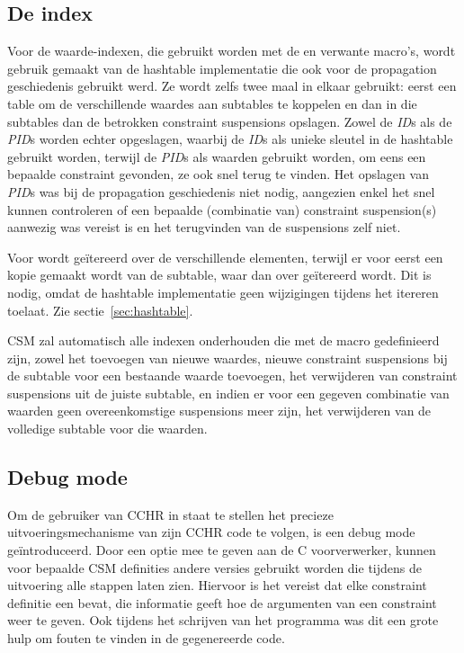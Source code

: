 {\subsection{De index} \label{sec:index}

Voor de waarde-indexen, die gebruikt worden met de  en verwante macro's, wordt gebruik gemaakt van de hashtable implementatie die ook voor de propagation geschiedenis gebruikt werd. Ze wordt zelfs twee maal in elkaar gebruikt: eerst een table om de verschillende waardes aan subtables te koppelen en dan in die subtables dan de betrokken constraint suspensions opslagen. Zowel de {\em ID}s als de {\em PID}s worden echter opgeslagen, waarbij de {\em ID}s als unieke sleutel in de hashtable gebruikt worden, terwijl de {\em PID}s als waarden gebruikt worden, om eens een bepaalde constraint gevonden, ze ook snel terug te vinden. Het opslagen van {\em PID}s was bij de propagation geschiedenis niet nodig, aangezien enkel het snel kunnen controleren of een bepaalde (combinatie van) constraint suspension(s) aanwezig was vereist is en het terugvinden van de suspensions zelf niet.

Voor  wordt ge\"itereerd over de verschillende elementen, terwijl er voor  eerst een kopie gemaakt wordt van de subtable, waar dan over ge\"itereerd wordt. Dit is nodig, omdat de hashtable implementatie geen wijzigingen tijdens het itereren toelaat. Zie sectie~\ref{sec:hashtable}.

CSM zal automatisch alle indexen onderhouden die met de macro  gedefinieerd zijn, zowel het toevoegen van nieuwe waardes, nieuwe constraint suspensions bij de subtable voor een bestaande waarde toevoegen, het verwijderen van constraint suspensions uit de juiste subtable, en indien er voor een gegeven combinatie van waarden geen overeenkomstige suspensions meer zijn, het verwijderen van de volledige subtable voor die waarden.

\subsection{Debug mode} \label{sec:debug}

Om de gebruiker van CCHR in staat te stellen het precieze uitvoeringsmechanisme van zijn CCHR code te volgen, is een debug mode ge\"introduceerd. Door een optie mee te geven aan de C voorverwerker, kunnen voor bepaalde CSM definities andere versies gebruikt worden die tijdens de uitvoering alle stappen laten zien. Hiervoor is het vereist dat elke constraint definitie een  bevat, die informatie geeft hoe de argumenten van een constraint weer te geven. Ook tijdens het schrijven van het programma was dit een grote hulp om fouten te vinden in de gegenereerde code.

}
